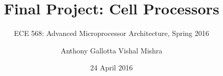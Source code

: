 \documentclass{sig-alternate-05-2015}
\begin{document}
%


\title{Final Project: Cell Processors}
\subtitle{ECE 568: Advanced Microprocessor Architecture, Spring 2016}
%
%
%
%
%

%
\author{
%
%
\alignauthor
Anthony Gallotta
\alignauthor
Vishal Mishra
}
\date{24 April 2016}
\end{document}
